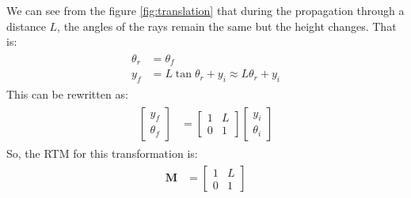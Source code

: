 \documentclass[12pt]{article}
\begin{document}
We can see from the figure \ref{fig:translation} that during the propagation through a distance \(L\), the angles of the rays remain the same but the height changes. That is:
\begin{align}
    \begin{split}
        \theta_r & = \theta_f \\
        y_f & = L\tan\theta_r + y_i \approx L\theta_r + y_i
    \end{split}
\end{align}
This can be rewritten as:
\begin{align}
    \begin{split}
        \begin{bmatrix}
            y_f \\
            \theta_f
        \end{bmatrix} & = \begin{bmatrix}
            1 & L \\
            0 & 1
        \end{bmatrix} \begin{bmatrix}
            y_i \\
            \theta_i
        \end{bmatrix}
    \end{split}
\end{align}
So, the RTM for this transformation is:
\begin{align}
    \label{eq:translation}
    \begin{split}
        \mathbf{M} & = \begin{bmatrix}
            1 & L \\
            0 & 1
        \end{bmatrix}
    \end{split}
\end{align}
\end{document}
